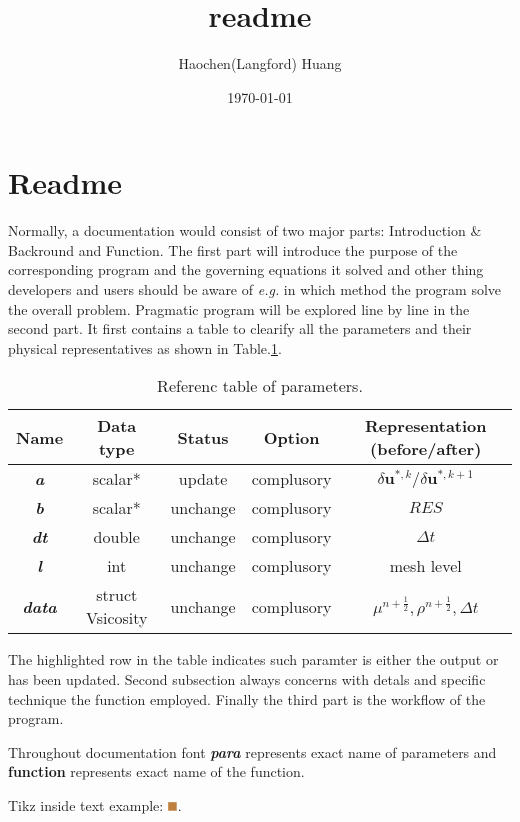 \documentclass[a4paper]{article}
\title{readme}
\author{Haochen(Langford) Huang}
\date{\today}
\newcommand{\func}[1]{\textbf{\textcolor{function}{#1}}}
\newcommand{\para}[1]{\textbf{\emph{\textcolor{para}{#1}}}}
\newcommand{\testA}{\tikz \fill[brown] (2pt,2pt) rectangle (8pt,8pt);}
\begin{document}
\maketitle

\section{Readme}
Normally, a documentation would consist of two major parts: Introduction \& Backround and Function. The first part will introduce the purpose of the corresponding program and the governing equations it solved and other thing developers and users should be aware of \emph{e.g.} in which method the program solve the overall problem. Pragmatic program will be explored line by line in the second part. It first contains a table to clearify all the parameters and their physical representatives as shown in Table.\ref{tab:test}. 
\begin{table}[h]
  \centering
  \begin{tabular}{|c|c|c|c|c|}
    \hline
    Name & Data type & Status & Option & Representation (before/after)\\[0.5ex]
    \hline\hline
    \rowcolor{output} \para{a} & scalar* & update & complusory & $\delta \mathbf{u}^{*,k}/\delta \mathbf{u}^{*,k+1}$\\
    \hline
    \para{b} & scalar* & unchange & complusory & $RES$\\
    \hline
    \para{dt} & double & unchange & complusory & $\Delta t$\\
    \hline
    \para{l} & int & unchange & complusory &  mesh level \\
    \hline
    \para{data} & struct Vsicosity & unchange & complusory & $\mu^ {n+\frac{1}{2}}, \rho^{n+\frac{1}{2}}, \Delta t$ \\
    \hline
  \end{tabular}
  \caption{Referenc table of parameters.}
  \label{tab:test}
\end{table}
The highlighted row in the table indicates such paramter is either the output or has been updated. Second subsection always concerns with detals and specific technique the function employed. Finally the third part is the workflow of the program.\par
Throughout documentation font \para{para} represents exact name of parameters and \func{function} represents exact name of the function.

Tikz inside text example: $\testA$.
\end{document}
